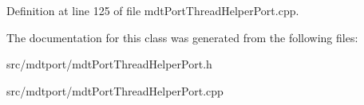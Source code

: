 Definition at line 125 of file mdtPortThreadHelperPort.cpp.



The documentation for this class was generated from the following files:\begin{DoxyCompactItemize}
\item 
src/mdtport/mdtPortThreadHelperPort.h\item 
src/mdtport/mdtPortThreadHelperPort.cpp\end{DoxyCompactItemize}
